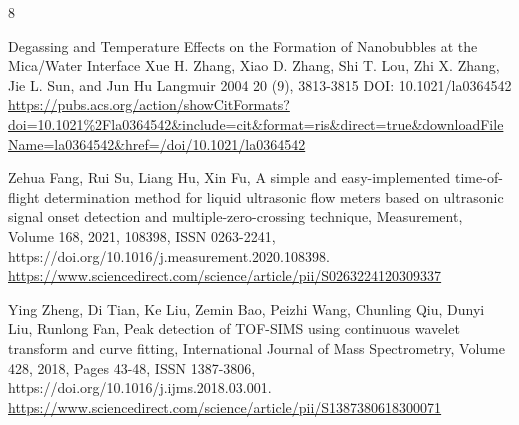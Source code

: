 \documentclass[runningheads]{llncs}
\begin{document}
\begin{thebibliography}{8}

Degassing and Temperature Effects on the Formation of Nanobubbles at the Mica/Water Interface
Xue H. Zhang, Xiao D. Zhang, Shi T. Lou, Zhi X. Zhang, Jie L. Sun, and Jun Hu
Langmuir 2004 20 (9), 3813-3815
DOI: 10.1021/la0364542
\url{https://pubs.acs.org/action/showCitFormats?doi=10.1021%2Fla0364542&include=cit&format=ris&direct=true&downloadFileName=la0364542&href=/doi/10.1021/la0364542}


Zehua Fang, Rui Su, Liang Hu, Xin Fu,
A simple and easy-implemented time-of-flight determination method for liquid ultrasonic flow meters based on ultrasonic signal onset detection and multiple-zero-crossing technique,
Measurement,
Volume 168,
2021,
108398,
ISSN 0263-2241,
https://doi.org/10.1016/j.measurement.2020.108398.
\url{https://www.sciencedirect.com/science/article/pii/S0263224120309337}


Ying Zheng, Di Tian, Ke Liu, Zemin Bao, Peizhi Wang, Chunling Qiu, Dunyi Liu, Runlong Fan,
Peak detection of TOF-SIMS using continuous wavelet transform and curve fitting,
International Journal of Mass Spectrometry,
Volume 428,
2018,
Pages 43-48,
ISSN 1387-3806,
https://doi.org/10.1016/j.ijms.2018.03.001.
\url{https://www.sciencedirect.com/science/article/pii/S1387380618300071}


\end{thebibliography}
\end{document}
